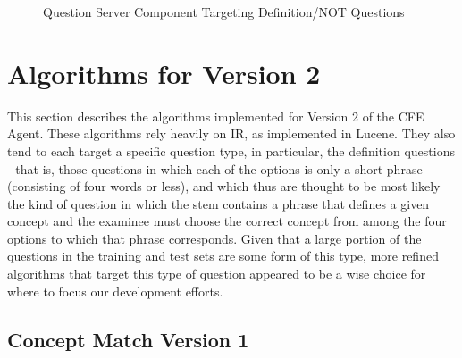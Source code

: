 \begin{figure}
\centering
\vspace{1.0in}
\caption{Question Server Component Targeting Definition/NOT Questions}
\label{fig:question_server}
\end{figure}


\section{Algorithms for Version 2}

This section describes the algorithms implemented for Version 2 of the CFE Agent.  These algorithms rely heavily on IR, as implemented in Lucene.  They also tend to each target a specific question type, in particular, the definition questions - that is, those questions in which each of the options is only a short phrase (consisting of four words or less), and which thus are thought to be most likely the kind of question in which the stem contains a phrase that defines a given concept and the examinee must choose the correct concept from among the four options to which that phrase corresponds.  Given that a large portion of the questions in the training and test sets are some form of this type, more refined algorithms that target this type of question appeared to be a wise choice for where to focus our development efforts.

\subsection{Concept Match Version 1}

